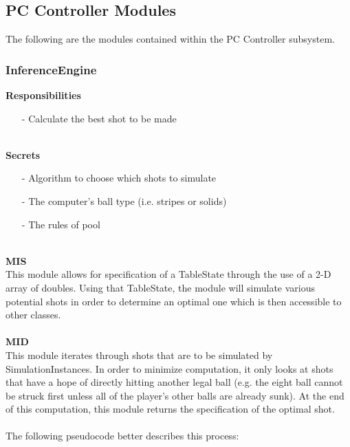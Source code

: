 \documentclass[titlepage]{article}
\begin{document}
\subsection{PC Controller Modules}
The following are the modules contained within the PC Controller subsystem.
\subsubsection{InferenceEngine}
\textbf{Responsibilities}
\begin{itemize}
	\item[-] Calculate the best shot to be made
\end{itemize}~\\
\textbf{Secrets}
\begin{itemize}
	\item[-] Algorithm to choose which shots to simulate
	\item[-] The computer's ball type (i.e. stripes or solids)
	\item[-] The rules of pool
\end{itemize}~\\
\textbf{MIS}\\[2mm]
This module allows for specification of a TableState through the use of a 2-D array of doubles. Using that TableState, the module will simulate various potential shots in order to determine an optimal one which is then accessible to other classes.
\\\\
\textbf{MID}\\[2mm]
This module iterates through shots that are to be simulated by SimulationInstances. In order to minimize computation, it only looks at shots that have a hope of directly hitting another legal ball (e.g. the eight ball cannot be struck first unless all of the player's other balls are already sunk). At the end of this computation, this module returns the specification of the optimal shot.\\~\\
The following pseudocode better describes this process:
\end{document}
